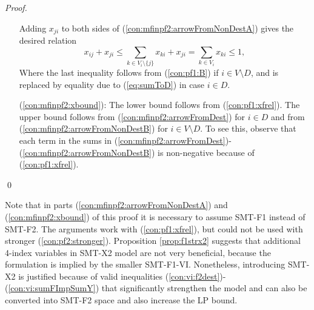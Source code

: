 \begin{proof}
\begin{itemize}[leftmargin=1cm]
 Adding $x_{ji}$ to both sides of (\ref{con:mfinpf2:arrowFromNonDestA}) gives the desired relation
\[
x_{ij}+x_{ji}\leq\sum_{k\in V_i\setminus\{j\}}x_{ki} +x_{ji}=\sum_{k\in V_i}x_{ki}\leq 1,
\]
Where the last inequality follows from (\ref{con:pf1:B}) if $i\in V\setminus D$, and is replaced by equality due to (\ref{eq:sumToD}) in case $i\in D$.
\item[ (\ref{con:mfinpf2:xbound}):] The lower bound follows from (\ref{con:pf1:xfrel}). The upper bound follows from (\ref{con:mfinpf2:arrowFromDest}) for $i\in D$ and from (\ref{con:mfinpf2:arrowFromNonDestB}) for $i\in V\setminus D$. To see this, observe that each term in the sums in (\ref{con:mfinpf2:arrowFromDest})-(\ref{con:mfinpf2:arrowFromNonDestB}) is non-negative because of (\ref{con:pf1:xfrel}). 
\end{itemize}\qed
\end{proof} 
Note that in parts (\ref{con:mfinpf2:arrowFromNonDestA}) and (\ref{con:mfinpf2:xbound}) of this proof it is necessary to assume SMT-F1 instead of SMT-F2. The arguments work with (\ref{con:pf1:xfrel}), but could not be used with stronger (\ref{con:pf2:stronger}).
Proposition \ref{prop:f1strx2} suggests that additional 4-index variables in SMT-X2 model are not very beneficial, because the formulation is implied by the smaller SMT-F1-VI. Nonetheless, introducing SMT-X2 is justified because of valid inequalities (\ref{con:vi:f2dest})-(\ref{con:vi:sumFImpSumY}) that significantly strengthen the model and can also be converted into SMT-F2 space and also increase the LP bound.
